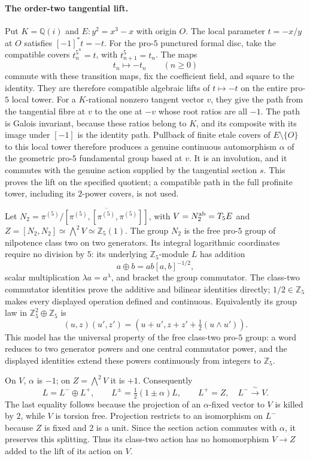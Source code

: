 \paragraph{The order-two tangential lift.}
Put $K=\mathbb Q(i)$ and $E:y^2=x^3-x$ with origin $O$. The local parameter $t=-x/y$ at $O$ satisfies $[-1]^*t=-t$. For the pro-$5$ punctured formal disc, take the compatible covers $t_n^{5^n}=t$, with $t_{n+1}^5=t_n$. The maps
\[
 t_n\longmapsto -t_n\qquad(n\geq0)
\]
commute with these transition maps, fix the coefficient field, and square to the identity. They are therefore compatible algebraic lifts of $t\mapsto-t$ on the entire pro-$5$ local tower. For a $K$-rational nonzero tangent vector $v$, they give the path from the tangential fibre at $v$ to the one at $-v$ whose root ratios are all $-1$. The path is Galois invariant, because these ratios belong to $K$, and its composite with its image under $[-1]$ is the identity path. Pullback of finite etale covers of $E\setminus\{O\}$ to this local tower therefore produces a genuine continuous automorphism $\alpha$ of the geometric pro-$5$ fundamental group based at $v$. It is an involution, and it commutes with the genuine action supplied by the tangential section $s$. This proves the lift on the specified quotient; a compatible path in the full profinite tower, including its $2$-power covers, is not used.

Let $N_2=\pi^{(5)}/\overline{[\pi^{(5)},[\pi^{(5)},\pi^{(5)}]]}$, with $V=N_2^{\rm ab}=T_5E$ and $Z=[N_2,N_2]\simeq\bigwedge^2V\simeq\mathbb Z_5(1)$. The group $N_2$ is the free pro-$5$ group of nilpotence class two on two generators. Its integral logarithmic coordinates require no division by $5$: its underlying $\mathbb Z_5$-module $L$ has addition
\[
 a\mathbin\oplus b=ab[a,b]^{-1/2},
\]
scalar multiplication $\lambda a=a^\lambda$, and bracket the group commutator. The class-two commutator identities prove the additive and bilinear identities directly; $1/2\in\mathbb Z_5$ makes every displayed operation defined and continuous. Equivalently its group law in $\mathbb Z_5^2\oplus\mathbb Z_5$ is
\[
 (u,z)(u',z')=(u+u',z+z'+\tfrac12(u\wedge u')).
\]
This model has the universal property of the free class-two pro-$5$ group: a word reduces to two generator powers and one central commutator power, and the displayed identities extend these powers continuously from integers to $\mathbb Z_5$.

On $V$, $\alpha$ is $-1$; on $Z=\bigwedge^2V$ it is $+1$. Consequently
\[
 L=L^-\oplus L^+,\qquad L^{\pm}=\tfrac12(1\pm\alpha)L,
 \qquad L^+=Z,\quad L^-\xrightarrow{\ \sim\ }V.
\]
The last equality follows because the projection of an $\alpha$-fixed vector to $V$ is killed by $2$, while $V$ is torsion free. Projection restricts to an isomorphism on $L^-$ because $Z$ is fixed and $2$ is a unit. Since the section action commutes with $\alpha$, it preserves this splitting. Thus its class-two action has no homomorphism $V\to Z$ added to the lift of its action on $V$.

